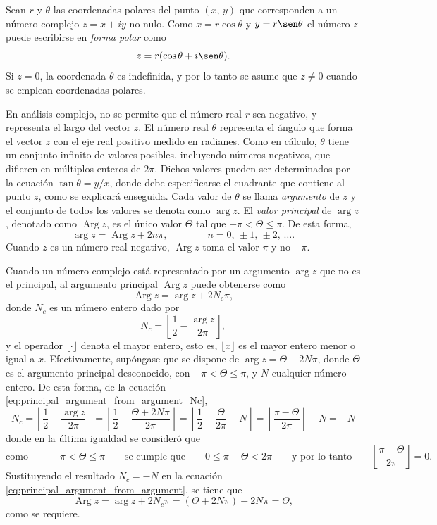 \documentclass[a4paper]{report}
\DeclareMathOperator{\Arg}{Arg}
\begin{document}
Sean \(r\) y \(\theta\) las coordenadas polares del punto \((x,\,y)\) que corresponden a un número complejo \(z=x+iy\) no nulo. Como \(x=r\cos\theta\) y \(y=r\sen\theta\) el número \(z\) puede escribirse en \emph{forma polar} como 
\[
 z=r(\cos\theta+i\sen\theta).
\]
Si \(z=0\), la coordenada \(\theta\) es indefinida, y por lo tanto se asume que \(z\neq0\) cuando se emplean coordenadas polares.

En análisis complejo, no se permite que el número real \(r\) sea negativo, y representa el largo del vector \(z\). El número real \(\theta\) representa el ángulo que forma el vector \(z\) con el eje real positivo medido en radianes. Como en cálculo, \(\theta\) tiene un conjunto infinito de valores posibles, incluyendo números negativos, que difieren en múltiplos enteros de \(2\pi\). Dichos valores pueden ser determinados por la ecuación \(\tan\theta=y/x\), donde debe especificarse el cuadrante que contiene al punto \(z\), como se explicará enseguida. Cada valor de \(\theta\) se llama \emph{argumento} de \(z\) y el conjunto de todos los valores se denota como \(\arg z\). El \emph{valor principal} de \(\arg z\), denotado como \(\Arg z\), es el único valor \(\Theta\) tal que \(-\pi<\Theta\leq\pi\). De esta forma,
\[
 \arg z=\Arg z+2n\pi,
 \qquad\qquad
 n=0,\,\pm1,\,\pm2,\,\dots.
\]
Cuando \(z\) es un número real negativo, \(\Arg z\) toma el valor \(\pi\) y no \(-\pi\).

Cuando un número complejo está representado por un argumento \(\arg z\) que no es el principal, al argumento principal \(\Arg z\) puede obtenerse como \cite{haber2019complex}
\begin{equation}\label{eq:principal_argument_from_argument}
 \Arg z=\arg z+2N_c\pi, 
\end{equation}
donde \(N_c\) es un número entero dado por 
\begin{equation}\label{eq:principal_argument_from_argument_Nc}
 N_c=\left\lfloor\frac{1}{2}-\frac{\arg z}{2\pi}\right\rfloor,
\end{equation}
y el operador \(\lfloor\cdot\rfloor\) denota el mayor entero, esto es, \(\lfloor x\rfloor\) es el mayor entero menor o igual a \(x\). Efectivamente, supóngase que se dispone de \(\arg z=\Theta+2N\pi\), donde \(\Theta\) es el argumento principal desconocido, con \(-\pi<\Theta\leq\pi\), y \(N\) cualquier número entero. De esta forma, de la ecuación \ref{eq:principal_argument_from_argument_Nc},
\[
 N_c=\left\lfloor\frac{1}{2}-\frac{\arg z}{2\pi}\right\rfloor
 =\left\lfloor\frac{1}{2}-\frac{\Theta+2N\pi}{2\pi}\right\rfloor
 =\left\lfloor\frac{1}{2}-\frac{\Theta}{2\pi}-N\right\rfloor
 =\left\lfloor\frac{\pi-\Theta}{2\pi}\right\rfloor-N
 =-N
\]
donde en la última igualdad se consideró que 
\[
 \textrm{como}\qquad
 -\pi<\Theta\leq\pi
 \qquad\textrm{se cumple que}\qquad 
 0\leq\pi-\Theta<2\pi
 \qquad\textrm{y por lo tanto}\qquad
 \left\lfloor\frac{\pi-\Theta}{2\pi}\right\rfloor=0.
\]
Sustituyendo el resultado \(N_c=-N\) en la ecuación \ref{eq:principal_argument_from_argument}, se tiene que 
\[
 \Arg z=\arg z+2N_c\pi=(\Theta+2N\pi)-2N\pi=\Theta,
\]
como se requiere.
\end{document}
